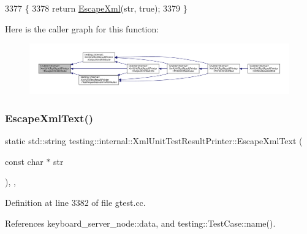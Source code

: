 \begin{DoxyCode}
3377                                                             \{
3378     \textcolor{keywordflow}{return} \hyperlink{classtesting_1_1internal_1_1XmlUnitTestResultPrinter_adadf42cf46ade9b26743466ce4b52f36}{EscapeXml}(str, \textcolor{keyword}{true});
3379   \}
\end{DoxyCode}
Here is the caller graph for this function\+:
\nopagebreak
\begin{figure}[H]
\begin{center}
\leavevmode
\includegraphics[width=350pt]{classtesting_1_1internal_1_1XmlUnitTestResultPrinter_aad574d7bb0c24578d5acc57817b9d367_icgraph}
\end{center}
\end{figure}
\mbox{\label{classtesting_1_1internal_1_1XmlUnitTestResultPrinter_a934486bda28e7013f2d07520d5098a31}} 
\subsubsection{\texorpdfstring{Escape\+Xml\+Text()}{EscapeXmlText()}}
{\footnotesize\ttfamily static std\+::string testing\+::internal\+::\+Xml\+Unit\+Test\+Result\+Printer\+::\+Escape\+Xml\+Text (\begin{DoxyParamCaption}\item[{const char $\ast$}]{str }\end{DoxyParamCaption})\hspace{0.3cm}{\ttfamily [inline]}, {\ttfamily [static]}, {\ttfamily [private]}}



Definition at line 3382 of file gtest.\+cc.



References keyboard\+\_\+server\+\_\+node\+::data, and testing\+::\+Test\+Case\+::name().


